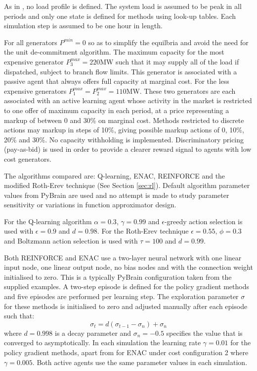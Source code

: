 As in , no load profile is defined. The
system load is assumed to be peak in all periods and only one state is defined
for methods using look-up tables.  Each simulation step is assumed to be one
hour in length.

For all generators $P^{min}=0$ so as to simplify the equilbria and avoid the
need for the unit de-commitment algorithm.  The maximum capacity for the most
expensive generator $P^{max}_3=220$MW such that it may supply all of the
load if dispatched, subject to branch flow limits.  This generator is
associated with a passive agent that always offers full capacity at marginal cost.  For the less expensive generators
$P^{max}_1=P^{max}_2=110$MW.  These two generators are each associated with an
active learning agent whose activity in the market is restricted to one offer of
maximum capacity in each period, at a price representing a markup of between 0
and 30\% on marginal cost.  Methods restricted to discrete actions may markup in
steps of 10\%, giving possible markup actions of 0, 10\%, 20\% and 30\%.  No
capacity withholding is implemented.
Discriminatory pricing (pay-as-bid) is used in order to provide a clearer reward
signal to agents with low cost generators.

The algorithms compared are: Q-learning, ENAC, REINFORCE and the modified
Roth-Erev technique (See Section \ref{sec:rl}). Default algorithm parameter
values from PyBrain are used and no attempt is made to study parameter
sensitivity or variations in function approximator design.

For the Q-learning algorithm $\alpha=0.3$, $\gamma=0.99$ and $\epsilon$-greedy
action selection is used with $\epsilon=0.9$ and $d=0.98$.  For the Roth-Erev
technique $\epsilon=0.55$, $\phi=0.3$ and Boltzmann action selection is used
with $\tau=100$ and $d=0.99$.

Both REINFORCE and ENAC use a two-layer neural network with one linear input
node, one linear output node, no bias nodes and with the connection weight
initialised to zero.  This is a typically PyBrain configuration taken from the
supplied examples. A two-step episode is defined for the policy gradient methods
and five episodes are performed per learning step.  The exploration parameter
$\sigma$ for these methods is initialised to zero and adjusted manually after
each episode such that:
\begin{equation}
\label{eq:sigmadecay}
\sigma_{t} = d(\sigma_{t-1}-\sigma_{n})+\sigma_{n}
\end{equation}
where $d=0.998$ is a decay parameter and $\sigma_{n}=-0.5$ specifies the
value that is converged to asymptotically.  In each simulation the learning rate
$\gamma=0.01$ for the policy gradient methods, apart from for ENAC under cost
configuration 2 where $\gamma=0.005$.  Both active agents use the same
parameter values in each simulation.

